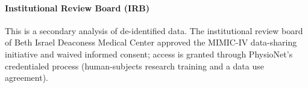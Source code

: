 \documentclass[pmlr,twocolumn,10pt]{jmlr} %
\begin{document}
\paragraph*{Institutional Review Board (IRB)}
This is a secondary analysis of de-identified data. The institutional review board of Beth Israel Deaconess Medical Center approved the MIMIC-IV data-sharing initiative and waived informed consent; access is granted through PhysioNet's credentialed process (human-subjects research training and a data use agreement).









\end{document}
